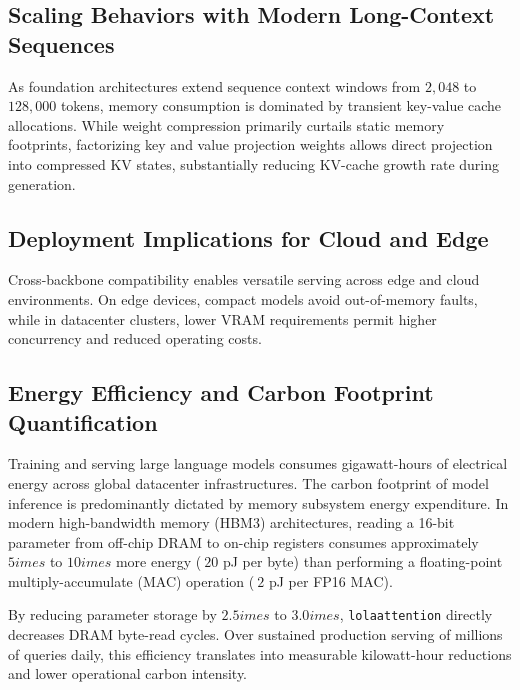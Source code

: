 \subsection{Scaling Behaviors with Modern Long-Context Sequences}
As foundation architectures extend sequence context windows from $2{,}048$ to $128{,}000$ tokens, memory consumption is dominated by transient key-value cache allocations. While weight compression primarily curtails static memory footprints, factorizing key and value projection weights allows direct projection into compressed KV states, substantially reducing KV-cache growth rate during generation.

\subsection{Deployment Implications for Cloud and Edge}
Cross-backbone compatibility enables versatile serving across edge and cloud environments. On edge devices, compact models avoid out-of-memory faults, while in datacenter clusters, lower VRAM requirements permit higher concurrency and reduced operating costs.

\subsection{Energy Efficiency and Carbon Footprint Quantification}
Training and serving large language models consumes gigawatt-hours of electrical energy across global datacenter infrastructures. The carbon footprint of model inference is predominantly dictated by memory subsystem energy expenditure. In modern high-bandwidth memory (HBM3) architectures, reading a 16-bit parameter from off-chip DRAM to on-chip registers consumes approximately $5	imes$ to $10	imes$ more energy ($~20$ pJ per byte) than performing a floating-point multiply-accumulate (MAC) operation ($~2$ pJ per FP16 MAC).

By reducing parameter storage by $2.5	imes$ to $3.0	imes$, \texttt{lolaattention} directly decreases DRAM byte-read cycles. Over sustained production serving of millions of queries daily, this efficiency translates into measurable kilowatt-hour reductions and lower operational carbon intensity.

